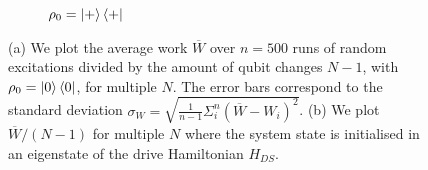 \begin{figure}[h]
\begin{subfigure}{0.4\textwidth}
	\caption{$\rho_0 = \ket{+}\bra{+}$}
	\label{dt_eigen}
	\end{subfigure}
	\caption{(a) We plot the average work $\overline{W}$ over $n = 500$ runs of random excitations divided by the amount of qubit changes $N - 1$, with $\rho_0 = \ket{0}\bra{0}$, for multiple $N$. The error bars correspond to the standard deviation $\sigma_{W} = \sqrt{\frac{1}{n-1} \Sigma_i^n (\overline{W} - W_i)^2}$.
	(b) We plot $\overline{W}/(N-1)$ for multiple $N$ where the system state is initialised in an eigenstate of the drive Hamiltonian $H_{DS}$.}
	\label{dt_dep}
\end{figure}